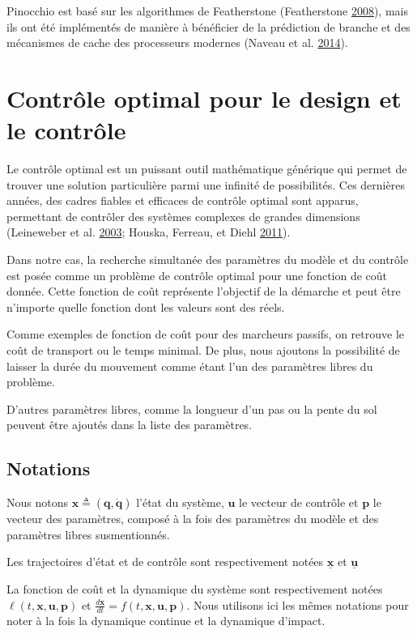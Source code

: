 \documentclass[french,A4paper,]{book}
\begin{document}
Pinocchio est basé sur les algorithmes de Featherstone (Featherstone
\protect\hyperlink{ref-featherstone08}{2008}), mais ils ont été
implémentés de manière à bénéficier de la prédiction de branche et des
mécanismes de cache des processeurs modernes (Naveau et al.
\protect\hyperlink{ref-metapod}{2014}).

\section{Contrôle optimal pour le design et le
contrôle}\label{sec:yoyosolv}

Le contrôle optimal est un puissant outil mathématique générique qui
permet de trouver une solution particulière parmi une infinité de
possibilités. Ces dernières années, des cadres fiables et efficaces de
contrôle optimal sont apparus, permettant de contrôler des systèmes
complexes de grandes dimensions (Leineweber et al.
\protect\hyperlink{ref-leineweber03}{2003}; Houska, Ferreau, et Diehl
\protect\hyperlink{ref-acado}{2011}).

Dans notre cas, la recherche simultanée des paramètres du modèle et du
contrôle est posée comme un problème de contrôle optimal pour une
fonction de coût donnée. Cette fonction de coût représente l'objectif de
la démarche et peut être n'importe quelle fonction dont les valeurs sont
des réels.

Comme exemples de fonction de coût pour des marcheurs passifs, on
retrouve le coût de transport ou le temps minimal. De plus, nous
ajoutons la possibilité de laisser la durée du mouvement comme étant
l'un des paramètres libres du problème.

D'autres paramètres libres, comme la longueur d'un pas ou la pente du
sol peuvent être ajoutés dans la liste des paramètres.

\subsection{Notations}\label{notations-1}

Nous notons \(\bm x \triangleq (\bm q, \bm{\dot q})\) l'état du système,
\(\bm u\) le vecteur de contrôle et \(\bm p\) le vecteur des paramètres,
composé à la fois des paramètres du modèle et des paramètres libres
susmentionnés.

Les trajectoires d'état et de contrôle sont respectivement notées
\(\underline{\bm x}\) et \(\underline{\bm u}\)

La fonction de coût et la dynamique du système sont respectivement
notées \(\ell(t, \bm x, \bm u, \bm p)\) et
\(\frac{d\bm x}{dt} = f(t, \bm x, \bm u, \bm p)\). Nous utilisons ici
les mêmes notations pour noter à la fois la dynamique continue et la
dynamique d'impact.
\end{document}

